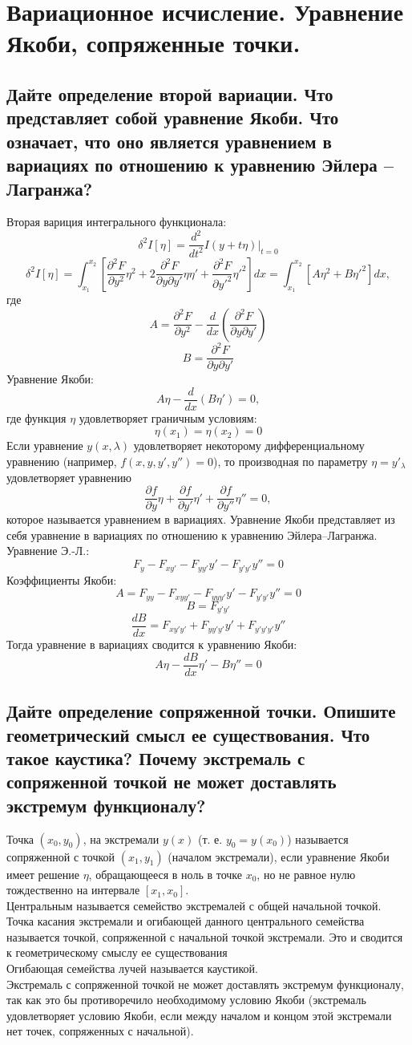 \documentclass{article}
\begin{document}
\section{Вариационное исчисление. Уравнение Якоби, сопряженные точки.}
\subsection{Дайте определение второй вариации. Что представляет собой уравнение Якоби. Что означает, что оно является уравнением в вариациях по отношению к уравнению Эйлера --Лагранжа?}
Вторая вариция интегрального функционала:
\[\delta^2 I [\eta]=\frac{d^2}{dt^2}I(y+t\eta)\bigg|_{t=0}\]
\[\delta^2 I [\eta]=\int_{x_1}^{x_2}\left[\frac{\partial^2 F}{\partial y^2}\eta^2 + 2\frac{\partial^2 F}{\partial y \partial y'}\eta\eta' + \frac{\partial^2 F}{\partial {y'}^2}{\eta'}^2\right]dx=
\int_{x_1}^{x_2} \left[A\eta^2+B\eta'^2\right]dx,\]
где
\[A=\frac{\partial^2 F}{\partial y^2} - \frac{d}{dx}\left(\frac{\partial^2 F}{\partial y \partial y'}\right) \]
\[B=\frac{\partial^2 F}{\partial y \partial y'}\]
Уравнение Якоби: 
\[A\eta-\frac{d}{dx}\left(B\eta'\right)=0 , \]
где функция $\eta$ удовлетворяет граничным условиям: 
\[\eta(x_1)=\eta(x_2)=0\]
Если уравнение $y(x,\lambda)$ удовлетворяет некоторому дифференциальному уравнению (например, $f(x,y,y',y'')=0$), то производная по параметру $\eta = y'_\lambda$ удовлетворяет уравнению
\[\frac{\partial f}{\partial y}\eta + \frac{\partial f}{\partial y'}\eta' + \frac{\partial f}{\partial y''}\eta''=0,\]
которое называется уравнением в вариациях. 
Уравнение Якоби представляет из себя уравнение в вариациях по отношению к уравнению Эйлера--Лагранжа. \\
Уравнение Э.-Л.: 
\[F_y-F_{xy'}-F_{yy'}y'-F_{y'y'}y''=0\]
Коэффициенты Якоби: 
\[A = F_{yy}-F_{xyy'}-F_{yyy'}y'-F_{y'y'}y''=0\]
\[B=F_{y'y'}\]
\[\frac{dB}{dx}=F_{xy'y'}+F_{yy'y'}y'+F_{y'y'y'}y''\]
Тогда уравнение в вариациях сводится к уравнению Якоби: 
\[A\eta-\frac{dB}{dx}\eta'-B\eta''=0\]
\subsection{Дайте определение сопряженной точки. Опишите геометрический смысл ее существования. Что такое каустика? Почему экстремаль с сопряженной точкой не может доставлять экстремум функционалу?}
Точка $(x_0,y_0)$, на экстремали $y(x)$ (т. е. $y_0=y(x_0)$) называется сопряженной с точкой $(x_1,y_1)$ (началом экстремали), если уравнение Якоби имеет решение $\eta$, обращающееся в ноль в точке $x_0$, но не равное нулю тождественно на интервале $[x_1,x_0]$.\\
Центральным называется семейство экстремалей с общей начальной точкой. Точка касания экстремали и огибающей данного центрального семейства называется точкой, сопряженной с начальной точкой экстремали. Это и сводится к геометрическому смыслу ее существования \\
Огибающая семейства лучей называется каустикой. \\
Экстремаль с сопряженной точкой не может доставлять экстремум функционалу, так как это бы противоречило необходимому условию Якоби (экстремаль удовлетворяет условию Якоби, если между началом и концом этой экстремали нет точек, сопряженных с начальной).
\end{document}
